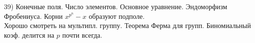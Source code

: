 39) Конечные поля. Число элементов. Основное уравнение. Эндоморфизм Фробениуса. Корни $x^{p^n} - x$ образуют подполе.\\

Хорошо смотреть на мультипл. группу. Теорема Ферма для групп. Биномиальный коэф. делится на $p$ почти всегда.\\

